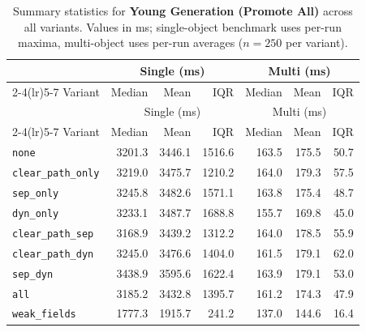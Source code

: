 \begin{longtable}{l rrr rrr}
\caption[Young Generation (Promote All) summary statistics]{Summary statistics for \textbf{Young Generation (Promote All)} across all variants. Values in ms; single-object benchmark uses per-run maxima, multi-object uses per-run averages ($n=250$ per variant).}\label{tab:stats-young-gen} \\
\toprule
 & \multicolumn{3}{c}{Single (ms)} & \multicolumn{3}{c}{Multi (ms)} \\
\cmidrule(lr){2-4}\cmidrule(lr){5-7}
Variant & Median & Mean & IQR & Median & Mean & IQR \\
\midrule
\endfirsthead
\toprule
 & \multicolumn{3}{c}{Single (ms)} & \multicolumn{3}{c}{Multi (ms)} \\
\cmidrule(lr){2-4}\cmidrule(lr){5-7}
Variant & Median & Mean & IQR & Median & Mean & IQR \\
\midrule
\endhead
\bottomrule
\endfoot
\texttt{none} & 3201.3 & 3446.1 & 1516.6 & 163.5 & 175.5 & 50.7 \\
\texttt{clear\_path\_only} & 3219.0 & 3475.7 & 1210.2 & 164.0 & 179.3 & 57.5 \\
\texttt{sep\_only} & 3245.8 & 3482.6 & 1571.1 & 163.8 & 175.4 & 48.7 \\
\texttt{dyn\_only} & 3233.1 & 3487.7 & 1688.8 & 155.7 & 169.8 & 45.0 \\
\texttt{clear\_path\_sep} & 3168.9 & 3439.2 & 1312.2 & 164.0 & 178.5 & 55.9 \\
\texttt{clear\_path\_dyn} & 3245.0 & 3476.6 & 1404.0 & 161.5 & 179.1 & 62.0 \\
\texttt{sep\_dyn} & 3438.9 & 3595.6 & 1622.4 & 163.9 & 179.1 & 53.0 \\
\texttt{all} & 3185.2 & 3432.8 & 1395.7 & 161.2 & 174.3 & 47.9 \\
\texttt{weak\_fields} & 1777.3 & 1915.7 & 241.2 & 137.0 & 144.6 & 16.4 \\
\end{longtable}
